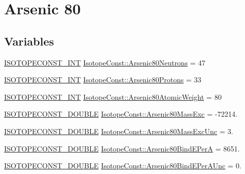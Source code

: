 \hypertarget{group___isotope_const-_arsenic-_as80}{}\section{Arsenic 80}
\label{group___isotope_const-_arsenic-_as80}
\subsection*{Variables}
\begin{DoxyCompactItemize}
\item 
\mbox{\hyperlink{group___isotope_const-_macros_ga5f18360b3e99483a35c32d789e62621c}{I\+S\+O\+T\+O\+P\+E\+C\+O\+N\+S\+T\+\_\+\+I\+NT}} \mbox{\hyperlink{group___isotope_const-_arsenic-_as80_ga10e37554aa4312602ac6b31f1dea5c64}{Isotope\+Const\+::\+Arsenic80\+Neutrons}} = 47
\item 
\mbox{\hyperlink{group___isotope_const-_macros_ga5f18360b3e99483a35c32d789e62621c}{I\+S\+O\+T\+O\+P\+E\+C\+O\+N\+S\+T\+\_\+\+I\+NT}} \mbox{\hyperlink{group___isotope_const-_arsenic-_as80_ga5af0d168188d17b567b26ae875facb59}{Isotope\+Const\+::\+Arsenic80\+Protons}} = 33
\item 
\mbox{\hyperlink{group___isotope_const-_macros_ga5f18360b3e99483a35c32d789e62621c}{I\+S\+O\+T\+O\+P\+E\+C\+O\+N\+S\+T\+\_\+\+I\+NT}} \mbox{\hyperlink{group___isotope_const-_arsenic-_as80_ga0d2a708f59ef66e1703c7ef496aeca1c}{Isotope\+Const\+::\+Arsenic80\+Atomic\+Weight}} = 80
\item 
\mbox{\hyperlink{group___isotope_const-_macros_ga8f45a7272ce02c0b4c65c44636ed719a}{I\+S\+O\+T\+O\+P\+E\+C\+O\+N\+S\+T\+\_\+\+D\+O\+U\+B\+LE}} \mbox{\hyperlink{group___isotope_const-_arsenic-_as80_ga1001f66cb14cef78d5077ba695a26750}{Isotope\+Const\+::\+Arsenic80\+Mass\+Exc}} = -\/72214.
\item 
\mbox{\hyperlink{group___isotope_const-_macros_ga8f45a7272ce02c0b4c65c44636ed719a}{I\+S\+O\+T\+O\+P\+E\+C\+O\+N\+S\+T\+\_\+\+D\+O\+U\+B\+LE}} \mbox{\hyperlink{group___isotope_const-_arsenic-_as80_ga8489e02f2cc5988d78ba6e5694242b9f}{Isotope\+Const\+::\+Arsenic80\+Mass\+Exc\+Unc}} = 3.
\item 
\mbox{\hyperlink{group___isotope_const-_macros_ga8f45a7272ce02c0b4c65c44636ed719a}{I\+S\+O\+T\+O\+P\+E\+C\+O\+N\+S\+T\+\_\+\+D\+O\+U\+B\+LE}} \mbox{\hyperlink{group___isotope_const-_arsenic-_as80_ga8ae9213dcfc71e8c8485a595bba25311}{Isotope\+Const\+::\+Arsenic80\+Bind\+E\+PerA}} = 8651.
\item 
\mbox{\hyperlink{group___isotope_const-_macros_ga8f45a7272ce02c0b4c65c44636ed719a}{I\+S\+O\+T\+O\+P\+E\+C\+O\+N\+S\+T\+\_\+\+D\+O\+U\+B\+LE}} \mbox{\hyperlink{group___isotope_const-_arsenic-_as80_ga525359726b8811baa3ae67a3763892a6}{Isotope\+Const\+::\+Arsenic80\+Bind\+E\+Per\+A\+Unc}} = 0.

\end{DoxyCompactItemize}
